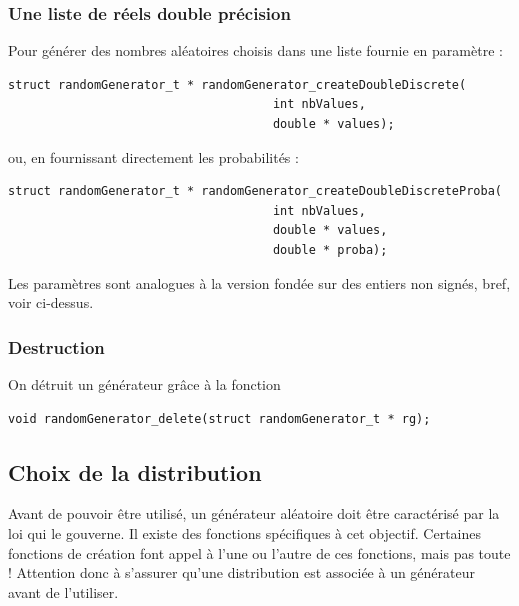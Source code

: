 \subsubsection{Une liste de réels double précision}

   Pour générer des nombres aléatoires choisis dans une liste fournie
en paramètre :

\begin{verbatim}
struct randomGenerator_t * randomGenerator_createDoubleDiscrete(
                                     int nbValues,
                                     double * values);
\end{verbatim}

   ou, en fournissant directement les probabilités :

\begin{verbatim}
struct randomGenerator_t * randomGenerator_createDoubleDiscreteProba(
                                     int nbValues,
                                     double * values,
                                     double * proba);
\end{verbatim}

   Les paramètres sont analogues à la version fondée sur des entiers
non signés, bref, voir ci-dessus.

%
\subsubsection{Destruction}

   On détruit un générateur grâce à la fonction

\begin{verbatim}
void randomGenerator_delete(struct randomGenerator_t * rg);
\end{verbatim}

%
\subsection{Choix de la distribution}

   Avant de pouvoir être utilisé, un générateur aléatoire doit être
caractérisé par la loi qui le gouverne. Il existe des fonctions
spécifiques à cet objectif. Certaines fonctions de création font appel
à l'une ou l'autre de ces fonctions, mais pas toute ! Attention donc à
s'assurer qu'une distribution est associée à un générateur avant de
l'utiliser.

